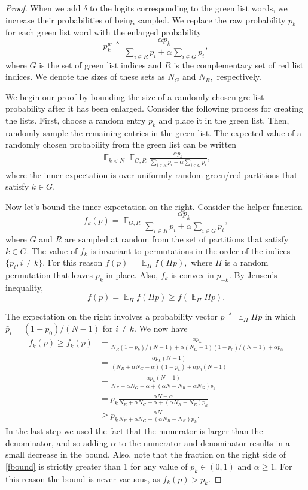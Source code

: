 \documentclass{article}
\theoremstyle{plain}
\theoremstyle{definition}
\theoremstyle{remark}
\DeclareMathOperator*{\expect}{\mathbb{E}}
\begin{document}
\begin{proof}
 When we add $\delta$ to the logits corresponding to the green list words, we increase their probabilities of being sampled. 
 We replace the raw probability $p_k$ for each green list word with the enlarged probability
   $$p^w_k \triangleq  \frac{\alpha p_k}{\sum_{i\in R} p_i + \alpha \sum_{i\in G} p_i },$$
where $G$ is the set of green list indices and $R$ is the complementary set of red list indices. We denote the sizes of these sets as $N_G$ and $N_R,$ respectively.

We begin our proof by bounding the size of a randomly chosen gre-list probability after it has been enlarged.  Consider the following process for creating the lists. First, choose a random entry $p_k$ and place it in the green list.  Then, randomly sample the remaining entries in the green list.  The expected value of a randomly chosen probability from the green list can be written  
 \begin{align}
 \expect_{k < N} \expect_{G, R}  \frac{\alpha p_k}{\sum_{i\in R} p_i + \alpha \sum_{i\in G} p_i }, \label{nested}
 \end{align}
 where the inner expectation is over uniformly random green/red partitions that satisfy $k\in G.$

 Now let's bound the inner expectation on the right.  Consider the helper function
 $$f_k(p) =  \expect_{G, R}  \frac{\alpha p_k}{\sum_{i\in R} p_i + \alpha \sum_{i\in G} p_i },$$
 where $G$ and $R$ are sampled at random from the set of partitions that satisfy $k \in G$. The value of $f_k$ is invariant to permutations in the order of the indices $\{p_i, i\neq k\}.$ For this reason $f(p) = \expect_\Pi f(\Pi p),$ where $\Pi$ is a random permutation that leaves $p_k$ in place.    Also, $f_k$ is convex in $p_{-k}$.  By Jensen's inequality, 
$$f(p) = \expect_\Pi f(\Pi p) \ge   f(\expect_\Pi \Pi p).  $$

The expectation on the right involves a probability vector  $\bar p \triangleq \expect_\Pi \Pi p$ in which $\bar p_i = (1-p_0)/(N-1)$ for $i\neq k.$  We now have
\begin{align} 
f_k(p) \ge f_k(\bar p) &=  \frac{\alpha p_k}{N_R(1-p_k)/(N-1) + \alpha (N_G-1)(1-p_0)/(N-1) + \alpha p_0 } \\
&=  \frac{\alpha p_k(N-1)}{ (N_R+\alpha N_G - \alpha) (1-p_k)   + \alpha p_0(N-1) } \\
&=  \frac{\alpha p_k(N-1)}{ N_R+\alpha N_G - \alpha +  (\alpha N - N_R-\alpha N_G  ) p_k  } \\ 
&=  p_k \frac{\alpha  N-\alpha }{ N_R+\alpha N_G - \alpha +  (\alpha N_R - N_R  ) p_k  } \\ 
&\ge  p_k \frac{\alpha  N}{ N_R+\alpha N_G +  (\alpha N_R - N_R  ) p_k  }.  \label{fbound}
\end{align}
In the last step we used the fact that the numerator is larger than the denominator, and so adding $\alpha$ to the numerator and denominator results in a small decrease in the bound.  Also, note that the fraction on the right side of \eqref{fbound} is strictly greater than 1 for any value of $p_k\in (0,1)$ and $\alpha \ge 1$. For this reason the bound is never vacuous, as $f_k(p)>p_k$. 


\end{proof}
\end{document}
